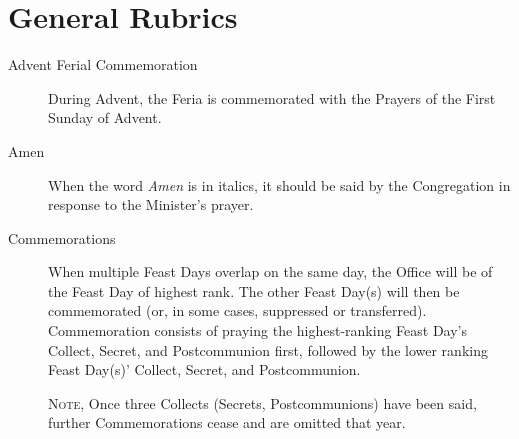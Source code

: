 \section*{General Rubrics}
\begin{description}
\item[Advent Ferial Commemoration] During Advent, the Feria is commemorated with the Prayers of the First Sunday of Advent.
	
\item[Amen] When the word \emph{Amen} is in italics, it should be said by the Congregation in response to the Minister's prayer.

\item[Commemorations] When multiple Feast Days overlap on the same day, the Office will be of the Feast Day of highest rank. The other Feast Day(s) will then be commemorated (or, in some cases, suppressed or transferred). Commemoration consists of praying the highest-ranking Feast Day's Collect, Secret, and Postcommunion first, followed by the lower ranking Feast Day(s)' Collect, Secret, and Postcommunion.\par
\textsc{Note,} Once three Collects (Secrets, Postcommunions) have been said, further Commemorations cease and are omitted that year.


\end{description}
